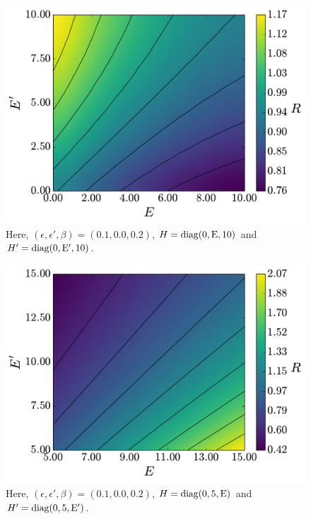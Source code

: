 \documentclass[pra,
aps,
twocolumn,
superscriptaddress,
groupedaddress,
nofootinbib,
reprint
]{revtex4-1}
\begin{document}

\begin{figure}
    \centering
    \includegraphics[scale=0.4]{figs/test/R_vs_E1.pdf}
    \caption{Here, $(\epsilon, \epsilon', \beta) = (0.1, 0.0, 0.2)$, $H = \rm{diag}(0,E,10)$ and $H' = \rm{diag}(0,E',10)$.
    }
    \label{fig:rvse1}
\end{figure}

\begin{figure}
    \centering
    \includegraphics[scale=0.4]{figs/test/R_vs_E2.pdf}
    \caption{Here, $(\epsilon, \epsilon', \beta) = (0.1, 0.0, 0.2)$, $H = \rm{diag}(0,5,E)$ and $H' = \rm{diag}(0,5,E')$.
    }
    \label{fig:rvse2}
\end{figure}
\end{document}
